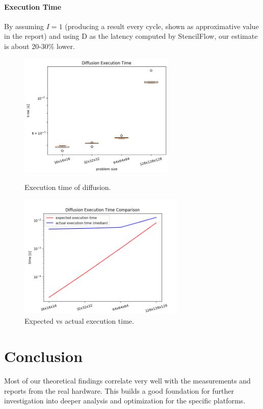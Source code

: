 \paragraph{Execution Time}
By assuming $I=1$  (producing a result every cycle, shown as approximative value in the report) and using D as the latency computed by StencilFlow, our estimate is about 20-30\% lower.
\begin{figure}[h]
	\begin{minipage}{.5\columnwidth}
		\centering
		\includegraphics[height=16em]{plots/diffusion_execution_time.png}
		\caption{Execution time of diffusion.}
		\label{fig:diffusion_execution_time}
	\end{minipage}
	\begin{minipage}{.5\columnwidth}
		\centering
		\includegraphics[height=16em]{plots/diffusion_execution_time_comparison.png}
		\caption{Expected vs actual execution time.}
		\label{fig:diffusion_execution_time_comparison}
	\end{minipage}
\end{figure}



\section{Conclusion} 
Most of our theoretical findings correlate very well with the measurements and reports from the real hardware. This builds a good foundation for further investigation into deeper analysis and optimization for the specific platforms. 

